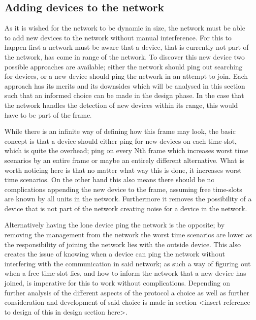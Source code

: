 \subsection{Adding devices to the network}
As it is wished for the network to be dynamic in size, the network must be able to add new devices to the network without manual interference.
For this to happen first a network must be aware that a device, that is currently not part of the network, has come in range of the network.
To discover this new device two possible approaches are available; either the network should ping out searching for devices, or a new device should ping the network in an attempt to join.
Each approach has its merits and its downsides which will be analysed in this section such that an informed choice can be made in the design phase.
In the case that the network handles the detection of new devices within its range, this would have to be part of the frame.

\bigskip
\noindent While there is an infinite way of defining how this frame may look, the basic concept is that a device should either ping for new devices on each time-slot, which is quite the overhead; ping on every Nth frame which increases worst time scenarios by an entire frame or maybe an entirely different alternative.
What is worth noticing here is that no matter what way this is done, it increases worst time scenarios.
On the other hand this also means there should be no complications appending the new device to the frame, assuming free time-slots are known by all units in the network.
Furthermore it removes the possibility of a device that is not part of the network creating noise for a device in the network.

Alternatively having the lone device ping the network is the opposite; by removing the management from the network the worst time scenarios are lower as the responsibility of joining the network lies with the outside device.
This also creates the issue of knowing when a device can ping the network without interfering with the communication in said network; as such a way of figuring out when a free time-slot lies, and how to inform the network that a new device has joined, is imperative for this to work without complications.
Depending on further analysis of the different aspects of the protocol a choice as well as further consideration and development of said choice is made in section <insert reference to design of this in design section here>.
